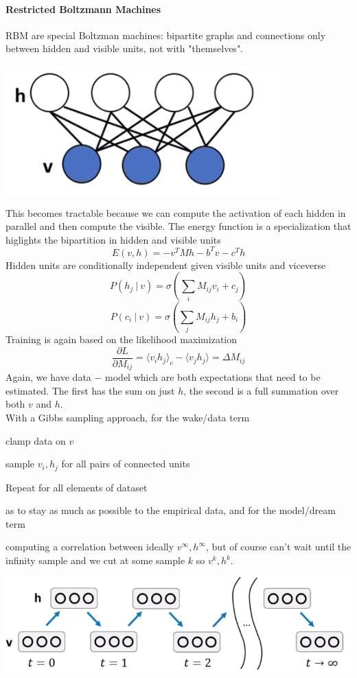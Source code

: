 \documentclass[10pt]{report}
\begin{document}
\paragraph{Restricted Boltzmann Machines} RBM are special Boltzman machines: bipartite graphs and connections only between hidden and visible units, not with "themselves".
\begin{center}
	\includegraphics[scale=0.5]{47.png}
\end{center}
This becomes tractable because we can compute the activation of each hidden in parallel and then compute the visible. The energy function is a specialization that higlights the bipartition in hidden and visible units $$E(v,h) = -v^TMh - b^Tv - c^Th$$
Hidden units are conditionally independent given visible units and viceverse
$$P(h_j\:|\:v)=\sigma\left(\sum_i M_{ij}v_i+c_j\right)$$
$$P(c_i\:|\:v)=\sigma\left(\sum_j M_{ij}h_j+b_i\right)$$
Training is again based on the likelihood maximization $$\frac{\partial L}{\partial M_{ij}} =\langle v_ih_j\rangle_c -\langle v_jh_j\rangle = \Delta M_{ij}$$
Again, we have data $-$ model which are both expectations that need to be estimated. The first has the sum on just $h$, the second is a full summation over both $v$ and $h$.\\
With a Gibbs sampling approach, for the wake/data term\begin{list}{}{}
	\item clamp data on $v$
	\item sample $v_i,h_j$ for all pairs of connected units
	\item Repeat for all elements of dataset
\end{list}
as to stay as much as possible to the empirical data, and for the model/dream term\begin{list}{}{}
	\item 
\end{list}
computing a correlation between ideally $v^\infty,h^\infty$, but of course can't wait until the infinity sample and we cut at some sample $k$ so $v^k,h^k$.
\begin{center}
	\includegraphics[scale=0.5]{48.png}
\end{center}
\end{document}
